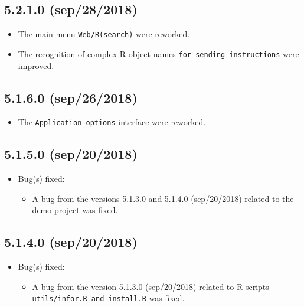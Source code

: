 \subsection*{5.2.1.0 (sep/28/2018)}
\begin{itemize}
  \item The main menu \texttt{Web/R(search)} were reworked.
  \item The recognition of complex R object names \texttt{for sending instructions} were improved.
\end{itemize}

\subsection*{5.1.6.0 (sep/26/2018)}
\begin{itemize}
  \item The \texttt{Application options} interface were reworked.
\end{itemize}

\subsection*{5.1.5.0 (sep/20/2018)}
\begin{itemize}
  \item Bug(s) fixed:
    \begin{itemize}
      \item A bug from the versions 5.1.3.0 and 5.1.4.0 (sep/20/2018) related to the demo project was fixed.
    \end{itemize}
\end{itemize}

\subsection*{5.1.4.0 (sep/20/2018)}
\begin{itemize}
  \item Bug(s) fixed:
    \begin{itemize}
      \item A bug from the version 5.1.3.0 (sep/20/2018) related to R scripts \texttt{utils/infor.R and install.R} was fixed.
    \end{itemize}
\end{itemize}


